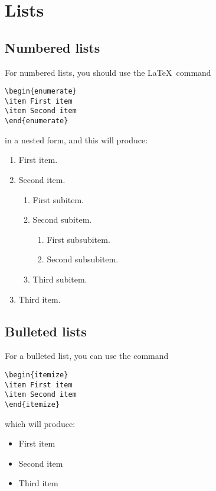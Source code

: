 \documentclass{RSMUP}
\theoremstyle{definition}
\begin{document}
\section{Lists}

\subsection{Numbered lists}
For numbered lists, you should use the \LaTeX\ command
\begin{verbatim}
\begin{enumerate}
\item First item
\item Second item
\end{enumerate}
\end{verbatim}
in a nested form, and this will produce:

\begin{enumerate}
\item First item.
\item Second item.
\begin{enumerate}
\item First subitem.
\item Second subitem.
\begin{enumerate}
\item First subsubitem.
\item Second subsubitem.
\end{enumerate}
\item Third subitem.
\end{enumerate}
\item Third item.
\end{enumerate}

\subsection{Bulleted lists}
For a bulleted list, you can use the command
\begin{verbatim}
\begin{itemize}
\item First item
\item Second item
\end{itemize}
\end{verbatim}
which will produce:

\begin{itemize}
\item First item
\item Second item
\item Third item
\end{itemize}
\end{document}

